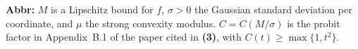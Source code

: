 \begin{table}[tp]
\begin{threeparttable}
\begin{tablenotes}[flushleft]\footnotesize
\item[] \textbf{Abbr:} $M$ is a Lipschitz bound for $f$, $\sigma>0$ the Gaussian standard deviation per coordinate, and $\mu$ the strong convexity modulus. $C=C(M/\sigma)$ is the probit factor in Appendix~B.1 of the paper cited in \textbf{(3)}, with $C(t)\ge\max\{1,t^2\}$.
\end{tablenotes}
\end{threeparttable}
\end{table}
